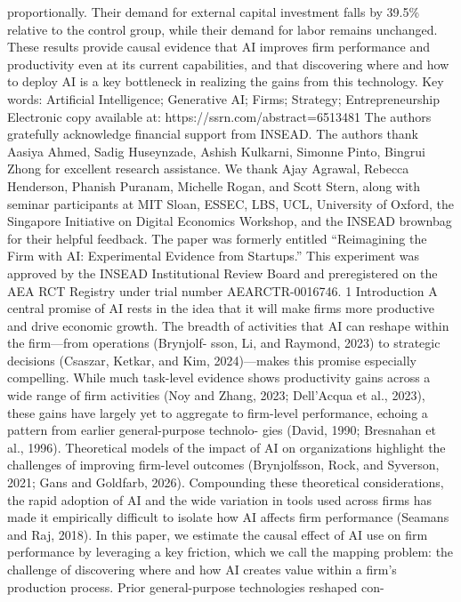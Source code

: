 proportionally. Their demand for external capital investment falls by 39.5\% relative to the control group, while their
demand for labor remains unchanged. These results provide causal evidence that AI improves firm performance
and productivity even at its current capabilities, and that discovering where and how to deploy AI is a key bottleneck
in realizing the gains from this technology.
Key words: Artificial Intelligence; Generative AI; Firms; Strategy; Entrepreneurship
Electronic copy available at: https://ssrn.com/abstract=6513481
The authors gratefully acknowledge financial support from INSEAD. The authors thank Aasiya Ahmed, Sadig
Huseynzade, Ashish Kulkarni, Simonne Pinto, Bingrui Zhong for excellent research assistance. We thank Ajay
Agrawal, Rebecca Henderson, Phanish Puranam, Michelle Rogan, and Scott Stern, along with seminar
participants at MIT Sloan, ESSEC, LBS, UCL, University of Oxford, the Singapore Initiative on Digital Economics
Workshop, and the INSEAD brownbag for their helpful feedback. The paper was formerly entitled “Reimagining
the Firm with AI: Experimental Evidence from Startups.” This experiment was approved by the INSEAD Institutional
Review Board and preregistered on the AEA RCT Registry under trial number AEARCTR-0016746.
1
Introduction
A central promise of AI rests in the idea that it will make firms more productive and drive economic
growth. The breadth of activities that AI can reshape within the firm—from operations (Brynjolf-
sson, Li, and Raymond, 2023) to strategic decisions (Csaszar, Ketkar, and Kim, 2024)—makes this
promise especially compelling. While much task-level evidence shows productivity gains across a
wide range of firm activities (Noy and Zhang, 2023; Dell’Acqua et al., 2023), these gains have largely
yet to aggregate to firm-level performance, echoing a pattern from earlier general-purpose technolo-
gies (David, 1990; Bresnahan et al., 1996). Theoretical models of the impact of AI on organizations
highlight the challenges of improving firm-level outcomes (Brynjolfsson, Rock, and Syverson, 2021;
Gans and Goldfarb, 2026). Compounding these theoretical considerations, the rapid adoption of AI
and the wide variation in tools used across firms has made it empirically difficult to isolate how AI
affects firm performance (Seamans and Raj, 2018).
In this paper, we estimate the causal effect of AI use on firm performance by leveraging a
key friction, which we call the mapping problem: the challenge of discovering where and how AI
creates value within a firm’s production process. Prior general-purpose technologies reshaped con-
